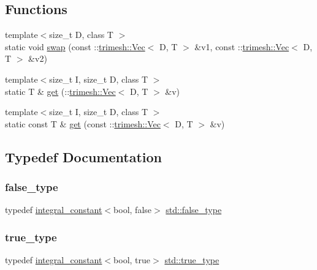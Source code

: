 \subsection*{Functions}
\begin{DoxyCompactItemize}
\item 
{\footnotesize template$<$size\+\_\+t D, class T $>$ }\\static void \hyperlink{namespacestd_a351b57d4089e8e63d265082e8458998e}{swap} (const \+::\hyperlink{classtrimesh_1_1Vec}{trimesh\+::\+Vec}$<$ D, T $>$ \&v1, const \+::\hyperlink{classtrimesh_1_1Vec}{trimesh\+::\+Vec}$<$ D, T $>$ \&v2)
\item 
{\footnotesize template$<$size\+\_\+t I, size\+\_\+t D, class T $>$ }\\static T \& \hyperlink{namespacestd_a91947210c20127a94cc8b6d99d99cad5}{get} (\+::\hyperlink{classtrimesh_1_1Vec}{trimesh\+::\+Vec}$<$ D, T $>$ \&v)
\item 
{\footnotesize template$<$size\+\_\+t I, size\+\_\+t D, class T $>$ }\\static const T \& \hyperlink{namespacestd_a2da806b1329765712c9c301c10666ccd}{get} (const \+::\hyperlink{classtrimesh_1_1Vec}{trimesh\+::\+Vec}$<$ D, T $>$ \&v)
\end{DoxyCompactItemize}


\subsection{Typedef Documentation}
\mbox{\label{namespacestd_aebe6729ab5488ecc76c762873d226857}} 
\subsubsection{\texorpdfstring{false\+\_\+type}{false\_type}}
{\footnotesize\ttfamily typedef \hyperlink{structstd_1_1integral__constant}{integral\+\_\+constant}$<$bool, false$>$ \hyperlink{namespacestd_aebe6729ab5488ecc76c762873d226857}{std\+::false\+\_\+type}}

\mbox{\label{namespacestd_a6a860513044e23d34e553ea986e83fa1}} 
\subsubsection{\texorpdfstring{true\+\_\+type}{true\_type}}
{\footnotesize\ttfamily typedef \hyperlink{structstd_1_1integral__constant}{integral\+\_\+constant}$<$bool, true$>$ \hyperlink{namespacestd_a6a860513044e23d34e553ea986e83fa1}{std\+::true\+\_\+type}}



